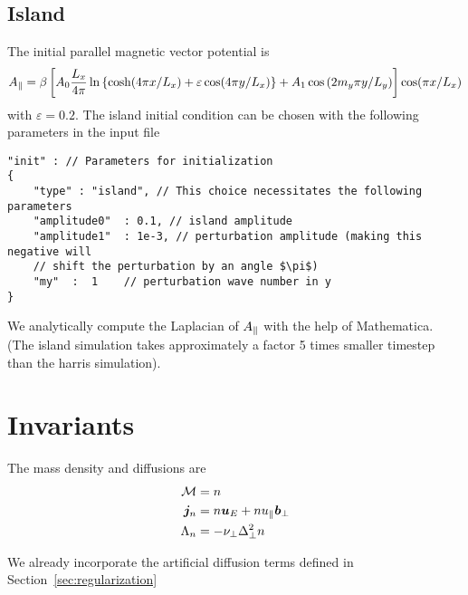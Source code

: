 \subsection{Island}
The initial parallel magnetic vector potential is~\cite{Stanier2015}
\begin{align}
    A_\parallel =\beta \left[ A_0\frac{L_x}{4\pi} \ln \left\{ \cosh( 4\pi x/L_x) + \varepsilon \cos( 4\pi y/L_x)\right\} + A_1\cos{(2m_y \pi y/L_y)}\right] \cos( \pi x /L_x)
\end{align}
with $\varepsilon = 0.2$.
The island initial condition can be chosen with the following parameters in the input file
\begin{verbatim}
"init" : // Parameters for initialization
{
    "type" : "island", // This choice necessitates the following parameters
    "amplitude0"  : 0.1, // island amplitude
    "amplitude1"  : 1e-3, // perturbation amplitude (making this negative will
    // shift the perturbation by an angle $\pi$)
    "my"  :  1    // perturbation wave number in y
}
\end{verbatim}
We analytically compute the Laplacian of $A_\parallel$ with the help of Mathematica.
(The island simulation takes approximately a factor 5 times smaller timestep than
the harris simulation).

\section{Invariants}
The mass density and diffusions are
\begin{align}
    \mathcal M &= n  \\
    {\boldsymbol{j}}_n &= n  {\boldsymbol{u}}_E + n u_\parallel {\boldsymbol{b}}_\perp \\
     \Lambda_n &= -\nu_\perp \Delta_\perp^2 n 
\end{align}
\begin{tcolorbox}[title=Note]
    We already incorporate the artificial diffusion terms defined in
    Section~\ref{sec:regularization}
\end{tcolorbox}


